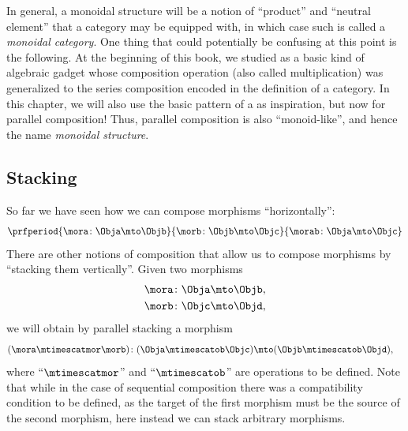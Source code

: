 
In general, a monoidal structure will be a notion of ``product'' and ``neutral element'' that a category may be equipped with, in which case such is called a \emph{monoidal category}.
One thing that could potentially be confusing at this point is the following.
At the beginning of this book, we studied  as a basic kind of algebraic gadget whose composition operation (also called multiplication) was generalized to the series composition encoded in the definition of a category.
In this chapter, we will also use the basic pattern of a  as inspiration, but now for parallel composition!
Thus, parallel composition is also ``monoid-like'', and hence the name \emph{monoidal structure}.



\subsection{Stacking}
\label{sec:stacking}

So far we have seen how we can compose morphisms ``horizontally'':
%
\begin{equation}
    \prfperiod{
        \mora \colon \Obja \mto \Objb
    }{
        \morb\colon \Objb \mto \Objc
    }{
        \morab \colon \Obja \mto \Objc
    }
\end{equation}
%
There are other notions of composition that allow us to compose morphisms by ``stacking them vertically''.
Given two morphisms
%
\begin{align}
    \mora & \colon \Obja \mto \Objb, \\
    \morb & \colon \Objc \mto \Objd,
\end{align}
%
we will obtain by parallel stacking a morphism
%
\begin{align}
    (\mora\mtimescatmor \morb)
     & \colon (\Obja \mtimescatob \Objc) \mto (\Objb \mtimescatob \Objd),
\end{align}
%
where ``$\mtimescatmor$'' and ``$\mtimescatob$'' are operations to be defined.
Note that while in the case of sequential composition there was a compatibility condition to be defined, as the target of the first morphism must be the source of the second morphism, here instead we can stack arbitrary morphisms.



\begin{marginfigure}
    \centering
    \caption{Stacked morphisms}
    \label{fig:stacked-morphisms}
\end{marginfigure}

